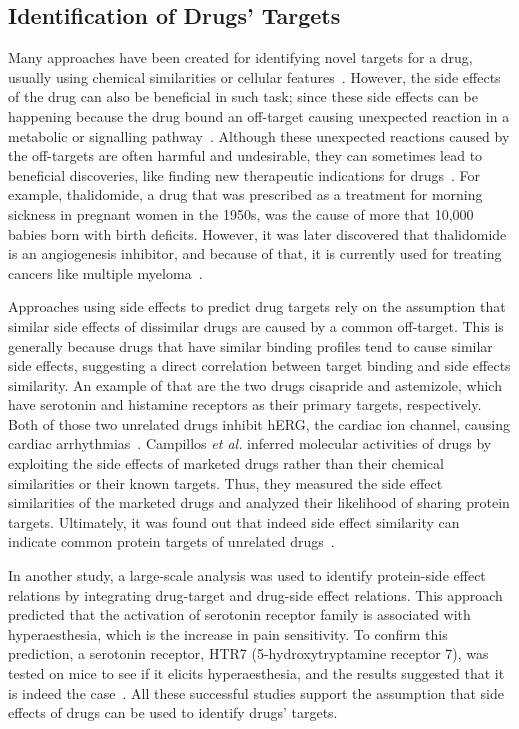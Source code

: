 \subsection{Identification of Drugs' Targets}

Many approaches have been created for identifying novel targets for a drug, usually using chemical similarities or cellular features~\cite{campillos_drug_2008}.
However, the side effects of the drug can also be beneficial in such task; since these side effects can be happening because the drug bound an off-target causing unexpected reaction in a metabolic or signalling pathway~\cite{lotfi_shahreza_review_2018}.
Although these unexpected reactions caused by the off-targets are often harmful and undesirable, they can sometimes lead to beneficial discoveries, like finding new therapeutic indications for drugs~\cite{campillos_drug_2008}.
For example, thalidomide, a drug that was prescribed as a treatment for morning sickness in pregnant women in the 1950s, was the cause of more that 10,000 babies born with birth deficits.
However, it was later discovered that thalidomide is an angiogenesis inhibitor, and because of that, it is currently used for treating cancers like multiple myeloma~\cite{vargesson_thalidomideinduced_2015}.

Approaches using side effects to predict drug targets rely on the assumption that similar side effects of dissimilar drugs are caused by a common off-target.
This is generally because drugs that have similar binding profiles tend to cause similar side effects, suggesting a direct correlation between target binding and side effects similarity.
An example of that are the two drugs cisapride and astemizole, which have serotonin and histamine receptors as their primary targets, respectively.
Both of those two unrelated drugs inhibit hERG, the cardiac ion channel, causing cardiac arrhythmias~\cite{campillos_drug_2008}.
Campillos \textit{et al.} inferred molecular activities of drugs by exploiting the side effects of marketed drugs rather than their chemical similarities or their known targets.
Thus, they measured the side effect similarities of the marketed drugs and analyzed their likelihood of sharing protein targets.
Ultimately, it was found out that indeed side effect similarity can indicate common protein targets of unrelated drugs~\cite{campillos_drug_2008}.

In another study, a large-scale analysis was used to identify protein-side effect relations by integrating drug-target and drug-side effect relations.
This approach predicted that the activation of serotonin receptor family is associated with hyperaesthesia, which is the increase in pain sensitivity.
To confirm this prediction, a serotonin receptor, HTR7 (5-hydroxytryptamine receptor 7), was tested on mice to see if it elicits hyperaesthesia, and the results suggested that it is indeed the case~\cite{kuhn_systematic_2014}.
All these successful studies support the assumption that side effects of drugs can be used to identify drugs' targets.

